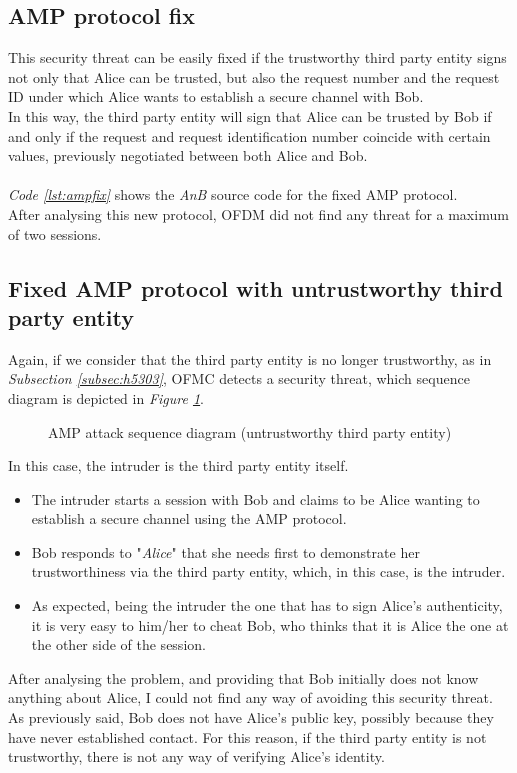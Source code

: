 \subsection{AMP protocol fix}\label{subsec:amp3}

This security threat can be easily fixed if the trustworthy third party entity signs not only that Alice can be trusted, but also the request number and the request ID under which Alice wants to establish a secure channel with Bob. \\
In this way, the third party entity will sign that Alice can be trusted by Bob if and only if the request and request identification number coincide with certain values, previously negotiated between both Alice and Bob.\\
\\
\textit{Code \ref{lst:ampfix}} shows the \textit{AnB} source code for the fixed AMP protocol.\\
After analysing this new protocol, OFDM did not find any threat for a maximum of two sessions.
\\


\subsection{Fixed AMP protocol with untrustworthy third party entity}\label{subsec:amp4}

Again, if we consider that the third party entity is no longer trustworthy, as in \textit{Subsection \ref{subsec:h5303}}, OFMC detects a security threat, which sequence diagram is depicted in \textit{Figure \ref{fig:amptraceS}}.\\
\begin{figure}[ht!]
	\centering	
	
	\caption{AMP attack sequence diagram (untrustworthy third party entity)}
	\label{fig:amptraceS}
\end{figure}
In this case, the intruder is the third party entity itself.
\begin{itemize}
	\item The intruder starts a session with Bob and claims to be Alice wanting to establish a secure channel using the AMP protocol.
	\item Bob responds to "\textit{Alice}" that she needs first to demonstrate her trustworthiness via the third party entity, which, in this case, is the intruder.
	\item As expected, being the intruder the one that has to sign Alice's authenticity, it is very easy to him/her to cheat Bob, who thinks that it is Alice the one at the other side of the session.
\end{itemize}
After analysing the problem, and providing that Bob initially does not know anything about Alice, I could not find any way of avoiding this security threat.\\
As previously said, Bob does not have Alice's public key, possibly because they have never established contact. For this reason, if the third party entity is not trustworthy, there is not any way of verifying Alice's identity.